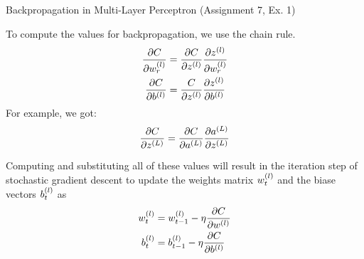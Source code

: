 \begin{highlight}{Backpropagation in Multi-Layer Perceptron (Assignment 7, Ex. 1)}
\begin{minipage}{0.5\columnwidth}
	To compute the values for backpropagation, we use the chain rule.
\begin{align*}
	\frac{\partial C}{\partial w^{(l)}_r} &= \frac{\partial C}{\partial z^{(l)}}\frac{\partial z^{(l)}}{\partial w^{(l)}_r} \\
	\frac{\partial C}{\partial b^{(l)}} &= \frac{C}{\partial z^{(l)}}\frac{\partial z^{(l)}}{\partial b^{(l)}} 
\end{align*}	
For example, we got:
	$$
		\frac{\partial C}{\partial z^{(L)}} = \frac{\partial C}{\partial a^{(L)}}\frac{\partial a^{(L)}}{\partial z^{(L)}}
	$$

Computing and substituting all of these values will result in the iteration step of stochastic gradient descent to update the weights matrix $w^{(l)}_t$ and the biase vectors $b^{(l)}_t$ as
\begin{align*}
	w^{(l)}_t &= w^{(l)}_{t-1} - \eta \frac{\partial C}{\partial w^{(l)}} \\
	b^{(l)}_t &= b^{(l)}_{t-1} - \eta\frac{\partial C}{\partial b^{(l)}}
\end{align*}


\end{minipage}
\end{highlight}
